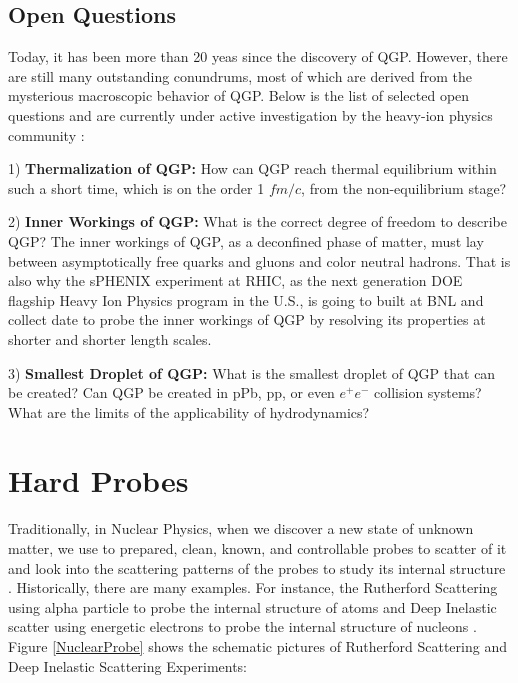 

 


\subsection{Open Questions}

Today, it has been more than 20 yeas since the discovery of QGP. However, there are still many outstanding conundrums, most of which are derived from the mysterious macroscopic behavior of QGP. Below is the list of selected open questions and are currently under active investigation by the heavy-ion physics community \cite{BigQuestions}:

1) \textbf{Thermalization of QGP:} How can QGP reach thermal equilibrium within such a short time, which is on the order 1 $fm/c$, from the non-equilibrium stage?

2) \textbf{Inner Workings of QGP:} What is the correct degree of freedom to describe QGP? The inner workings of QGP, as a deconfined phase of matter, must lay between asymptotically free quarks and gluons and color neutral hadrons. That is also why the sPHENIX experiment at RHIC, as the next generation DOE flagship Heavy Ion Physics program in the U.S., is going to built at BNL and collect date to probe the inner workings of QGP by resolving its properties at shorter and shorter length scales. 

3) \textbf{Smallest Droplet of QGP:} What is the smallest droplet of QGP that can be created? Can QGP be created in pPb, pp, or even $e^+e^-$ collision systems? What are the limits of the applicability of hydrodynamics?


\section{Hard Probes}

Traditionally, in Nuclear Physics, when we discover a new state of unknown matter, we use to prepared, clean, known, and controllable probes to scatter of it and look into the scattering patterns of the probes to study its internal structure . Historically, there are many examples. For instance, the Rutherford Scattering using alpha particle to probe the internal structure of atoms \cite{Rutherford} and Deep Inelastic scatter using energetic electrons to probe the internal structure of nucleons \cite{Henry,Richard,Jerry}. Figure \ref{NuclearProbe} shows the schematic pictures of Rutherford Scattering and Deep Inelastic Scattering Experiments:

